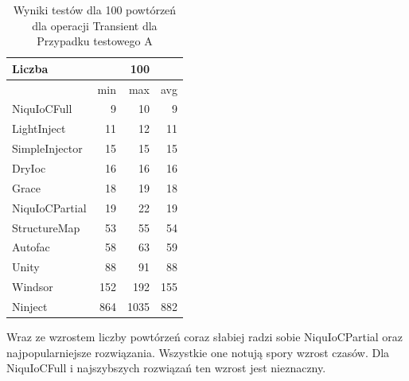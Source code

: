 \documentclass[12pt]{article}
\begin{document}
\begin{table}[H]
\captionsetup{belowskip=0pt,aboveskip=0pt}
\begin{center}
\begin{small}
	\begin{tabular}{ | l | r r r | }
    		\hline
Liczba & & 100 & \\ \hline
 & min & max & avg \\ \hline
NiquIoCFull & 9 & 10 & 9 \\ \hline
LightInject & 11 & 12 & 11 \\ \hline
SimpleInjector & 15 & 15 & 15 \\ \hline
DryIoc & 16 & 16 & 16 \\ \hline
Grace & 18 & 19 & 18 \\ \hline
NiquIoCPartial & 19 & 22 & 19 \\ \hline
StructureMap & 53 & 55 & 54 \\ \hline
Autofac & 58 & 63 & 59 \\ \hline
Unity & 88 & 91 & 88 \\ \hline
Windsor & 152 & 192 & 155 \\ \hline
Ninject & 864 & 1035 & 882 \\ \hline
  	\end{tabular}
\end{small}
\end{center}
\caption{Wyniki testów dla 100 powtórzeń dla operacji Transient dla Przypadku testowego A}
\label{TestCaseA_Transient100}
\end{table}
Wraz ze wzrostem liczby powtórzeń coraz słabiej radzi sobie NiquIoCPartial oraz najpopularniejsze rozwiązania. Wszystkie one notują spory wzrost czasów. Dla NiquIoCFull i najszybszych rozwiązań ten wzrost jest nieznaczny.
\\ \\
\end{document}
